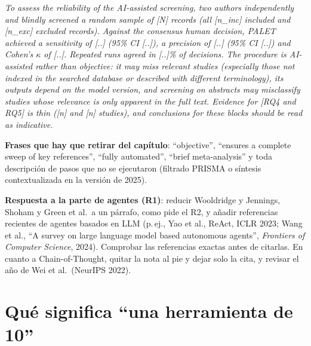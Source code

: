 \documentclass[11pt,a4paper]{article}
\begin{document}
\begin{nota}
\small
\emph{To assess the reliability of the AI-assisted screening, two authors independently and blindly screened a random sample of [N] records (all [n\_inc] included and [n\_exc] excluded records). Against the consensus human decision, PALET achieved a sensitivity of [..] (95\% CI [..]), a precision of [..] (95\% CI [..]) and Cohen's $\kappa$ of [..]. Repeated runs agreed in [..]\% of decisions. The procedure is AI-assisted rather than objective: it may miss relevant studies (especially those not indexed in the searched database or described with different terminology), its outputs depend on the model version, and screening on abstracts may misclassify studies whose relevance is only apparent in the full text. Evidence for [RQ4 and RQ5] is thin ([n] and [n] studies), and conclusions for these blocks should be read as indicative.}
\end{nota}

\textbf{Frases que hay que retirar del capítulo}: ``objective'', ``ensures a complete sweep of key references'', ``fully automated'', ``brief meta-analysis'' y toda descripción de pasos que no se ejecutaron (filtrado PRISMA o síntesis contextualizada en la versión de 2025).

\textbf{Respuesta a la parte de agentes (R1)}: reducir Wooldridge y Jennings, Shoham y Green et al.\ a un párrafo, como pide el R2, y añadir referencias recientes de agentes basados en LLM (p.\,ej., Yao et al., ReAct, ICLR 2023; Wang et al., ``A survey on large language model based autonomous agents'', \emph{Frontiers of Computer Science}, 2024). Comprobar las referencias exactas antes de citarlas. En cuanto a Chain-of-Thought, quitar la nota al pie y dejar solo la cita, y revisar el año de Wei et al.\ (NeurIPS 2022).

\section{Qué significa ``una herramienta de 10''}
\end{document}

